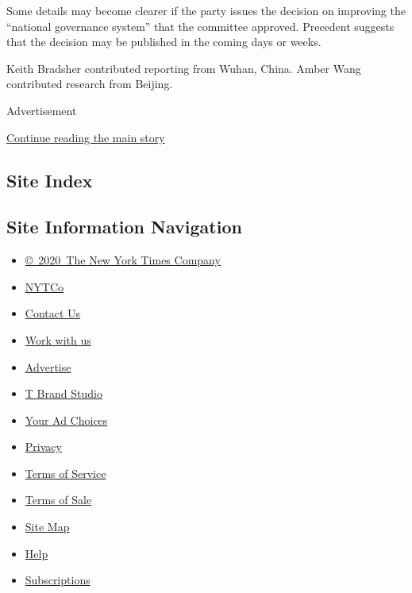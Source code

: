 Some details may become clearer if the party issues the decision on
improving the ``national governance system'' that the committee
approved. Precedent suggests that the decision may be published in the
coming days or weeks.

Keith Bradsher contributed reporting from Wuhan, China. Amber Wang
contributed research from Beijing.

Advertisement

\protect\hyperlink{after-bottom}{Continue reading the main story}

\hypertarget{site-index}{%
\subsection{Site Index}\label{site-index}}

\hypertarget{site-information-navigation}{%
\subsection{Site Information
Navigation}\label{site-information-navigation}}

\begin{itemize}
\tightlist
\item
  \href{https://help.nytimes.com/hc/en-us/articles/115014792127-Copyright-notice}{©~2020~The
  New York Times Company}
\end{itemize}

\begin{itemize}
\tightlist
\item
  \href{https://www.nytco.com/}{NYTCo}
\item
  \href{https://help.nytimes.com/hc/en-us/articles/115015385887-Contact-Us}{Contact
  Us}
\item
  \href{https://www.nytco.com/careers/}{Work with us}
\item
  \href{https://nytmediakit.com/}{Advertise}
\item
  \href{http://www.tbrandstudio.com/}{T Brand Studio}
\item
  \href{https://www.nytimes.com/privacy/cookie-policy\#how-do-i-manage-trackers}{Your
  Ad Choices}
\item
  \href{https://www.nytimes.com/privacy}{Privacy}
\item
  \href{https://help.nytimes.com/hc/en-us/articles/115014893428-Terms-of-service}{Terms
  of Service}
\item
  \href{https://help.nytimes.com/hc/en-us/articles/115014893968-Terms-of-sale}{Terms
  of Sale}
\item
  \href{https://spiderbites.nytimes.com}{Site Map}
\item
  \href{https://help.nytimes.com/hc/en-us}{Help}
\item
  \href{https://www.nytimes.com/subscription?campaignId=37WXW}{Subscriptions}
\end{itemize}
